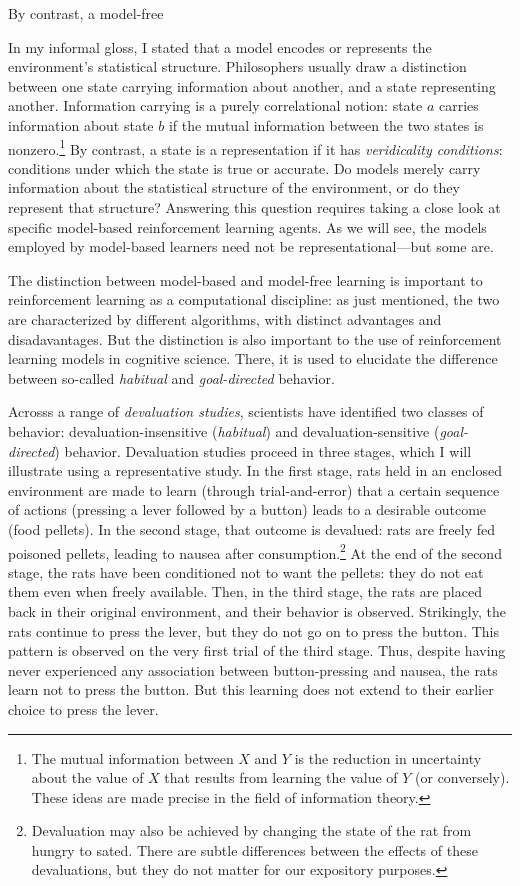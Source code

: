 By contrast, a model-free 

In my informal gloss, I stated that a model encodes or represents the environment's statistical structure.
Philosophers usually draw a distinction between one state carrying information about another, and a state representing another.
Information carrying is a purely correlational notion: state $a$ carries information about state $b$ if the mutual information between the two states is nonzero.\footnote{The mutual information between $X$ and $Y$ is the reduction in uncertainty about the value of $X$ that results from learning the value of $Y$ (or conversely). These ideas are made precise in the field of information theory.}
By contrast, a state is a representation if it has \emph{veridicality conditions}: conditions under which the state is true or accurate.
Do models merely carry information about the statistical structure of the environment, or do they represent that structure?
Answering this question requires taking a close look at specific model-based reinforcement learning agents.
As we will see, the models employed by model-based learners need not be representational---but some are.

The distinction between model-based and model-free learning is important to reinforcement learning as a computational discipline: as just mentioned, the two are characterized by different algorithms, with distinct advantages and disadavantages.
But the distinction is also important to the use of reinforcement learning models in cognitive science.
There, it is used to elucidate the difference between so-called \emph{habitual} and \emph{goal-directed} behavior.

Acrosss a range of \emph{devaluation studies}, scientists have identified two classes of behavior: devaluation-insensitive (\emph{habitual}) and devaluation-sensitive (\emph{goal-directed}) behavior.
Devaluation studies proceed in three stages, which I will illustrate using a representative study.
In the first stage, rats held in an enclosed environment are made to learn (through trial-and-error) that a certain sequence of actions (pressing a lever followed by a button) leads to a desirable outcome (food pellets).
In the second stage, that outcome is devalued: rats are freely fed poisoned pellets, leading to nausea after consumption.\footnote{Devaluation may also be achieved by changing the state of the rat from hungry to sated. There are subtle differences between the effects of these devaluations, but they do not matter for our expository purposes.}
At the end of the second stage, the rats have been conditioned not to want the pellets: they do not eat them even when freely available.
Then, in the third stage, the rats are placed back in their original environment, and their behavior is observed.
Strikingly, the rats continue to press the lever, but they do not go on to press the button.
This pattern is observed on the very first trial of the third stage.
Thus, despite having never experienced any association between button-pressing and nausea, the rats learn not to press the button.
But this learning does not extend to their earlier choice to press the lever.

